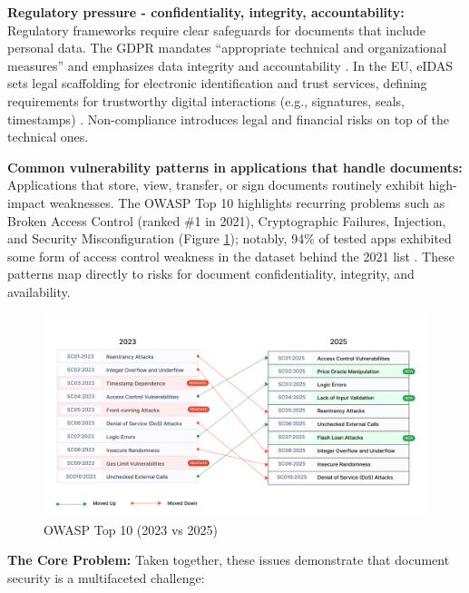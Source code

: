 \textbf{Regulatory pressure - confidentiality, integrity, accountability:} Regulatory frameworks require clear safeguards for documents that include personal data. The GDPR mandates “appropriate technical and organizational measures” and emphasizes data integrity and accountability \cite{eur-lex_gdpr_nodate}. In the EU, eIDAS sets legal scaffolding for electronic identification and trust services, defining requirements for trustworthy digital interactions (e.g., signatures, seals, timestamps) \cite{eur-lex_eidas_nodate}. Non-compliance introduces legal and financial risks on top of the technical ones.

\textbf{Common vulnerability patterns in applications that handle documents:} Applications that store, view, transfer, or sign documents routinely exhibit high-impact weaknesses. The OWASP Top 10 highlights recurring problems such as Broken Access Control (ranked \#1 in 2021), Cryptographic Failures, Injection, and Security Misconfiguration (Figure \ref{owasp-top10}); notably, 94\% of tested apps exhibited some form of access control weakness in the dataset behind the 2021 list \cite{owasp_top_nodate,owasp_a01_nodate}. These patterns map directly to risks for document confidentiality, integrity, and availability.

\begin{figure}[H]
    \centering
    \includegraphics[width=18cm]{"images/owasp-top10.png"}
    \caption{OWASP Top 10 (2023 vs 2025)}
    \label{owasp-top10}
\end{figure}

\textbf{The Core Problem:} Taken together, these issues demonstrate that document security is a multifaceted challenge:

